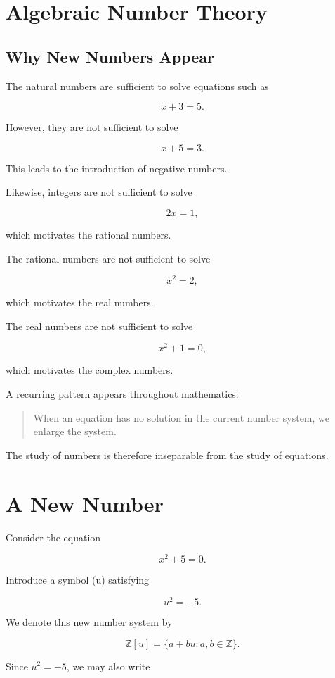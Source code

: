 
\section{Algebraic Number Theory}
\subsection{Why New Numbers Appear}

The natural numbers are sufficient to solve equations such as

\[
x+3=5.
\]

However, they are not sufficient to solve

\[
x+5=3.
\]

This leads to the introduction of negative numbers.

Likewise, integers are not sufficient to solve

\[
2x=1,
\]

which motivates the rational numbers.

The rational numbers are not sufficient to solve

\[
x^2=2,
\]

which motivates the real numbers.

The real numbers are not sufficient to solve

\[
x^2+1=0,
\]

which motivates the complex numbers.

A recurring pattern appears throughout mathematics:

\begin{quote}
When an equation has no solution in the current number system, we enlarge the system.
\end{quote}

The study of numbers is therefore inseparable from the study of equations.

\section{A New Number}

Consider the equation

\[
x^2+5=0.
\]

Introduce a symbol (u) satisfying

\[
u^2=-5.
\]

We denote this new number system by

\[
\mathbb Z[u]
=
\{a+bu : a,b\in\mathbb Z\}.
\]

Since \(u^2=-5\), we may also write

